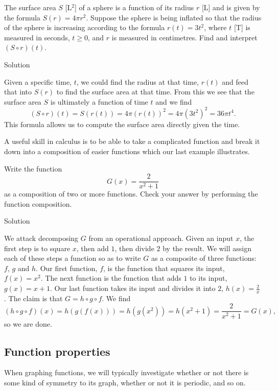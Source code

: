 \begin{example}
  The surface area $S$ [L$^2$] of a sphere is a function of its radius $r$ [L] and is given by the formula $S(r) = 4 \pi r^2$.  Suppose the sphere is being inflated so that the radius of the sphere is increasing according to the formula $r(t) = 3t^2$, where $t$ [T] is measured in seconds, $t \geq 0$, and $r$ is measured in centimetres.  Find and interpret $(S \circ r)(t)$.

Solution 

 Given a specific time, $t$, we could find the radius at that time, $r(t)$ and feed that into $S(r)$ to find the surface area at that time.  From this we see that the surface area $S$ is ultimately a function of time $t$ and we find 
$$(S \circ r)(t) = S(r(t)) = 4 \pi (r(t))^2 = 4 \pi \left(3t^2\right)^2 = 36 \pi t^{4}.$$  
This formula allows us to compute the surface area directly given the time. 

\end{example}

A useful skill in calculus is to be able to take a complicated function and break it down into a composition of easier functions which our last example illustrates.

\begin{example}
Write  the  function
$$
G(x) = \dfrac{2}{x^2+1}
$$
 as a composition of two or more functions.  Check your answer by performing the function composition.

Solution 

We attack decomposing $G$ from an operational approach.  Given an input $x$, the first step is to square $x$, then add $1$, then divide $2$ by the result.  We will assign each of these steps a function so as to write $G$ as a composite of three functions: $f$, $g$ and $h$.  Our first function, $f$, is the function that squares its input, $f(x) = x^2$.  The next function is the function that adds $1$ to its input, $g(x) = x+1$.  Our last function takes its input and divides it into $2$, $h(x) = \frac{2}{x}$.  The claim is that $G = h \circ g \circ f$. We find  
\[(h \circ g \circ f)(x) = h(g(f(x))) = h(g\left(x^2\right)) = h\left(x^2+1\right)= \frac{2}{x^2+1} = G(x),\]
 so we are done.

\end{example}

\fi



\subsection{Function properties}\label{eig_functies}
When graphing functions, we will typically investigate whether or not there is some kind of symmetry to its graph, whether or not it is periodic, and so on. 

